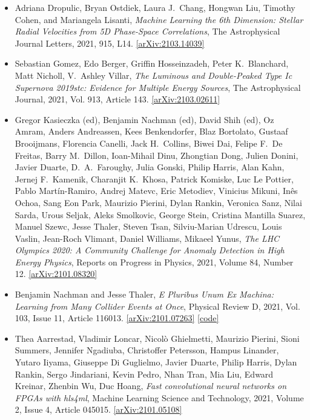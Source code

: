 \begin{itemize}
\item Adriana Dropulic, Bryan Ostdiek, Laura J.\  Chang, Hongwan Liu, Timothy Cohen, and Mariangela Lisanti, \textit{Machine Learning the 6th Dimension: Stellar Radial Velocities from 5D Phase-Space Correlations}, The Astrophysical Journal Letters, 2021, 915, L14. \href{https://arxiv.org/abs/2103.14039}{[arXiv:2103.14039]} 
\item Sebastian Gomez, Edo Berger, Griffin Hosseinzadeh, Peter K.\  Blanchard, Matt Nicholl, V.\  Ashley Villar, \textit{The Luminous and Double-Peaked Type Ic Supernova 2019stc: Evidence for Multiple Energy Sources}, The Astrophysical Journal, 2021, Vol. 913, Article 143. \href{https://arxiv.org/abs/2103.02611}{[arXiv:2103.02611]} 
\item Gregor Kasieczka (ed), Benjamin Nachman (ed), David Shih (ed), Oz Amram, Anders Andreassen, Kees Benkendorfer, Blaz Bortolato, Gustaaf Brooijmans, Florencia Canelli, Jack H.\  Collins, Biwei Dai, Felipe F.\  De Freitas, Barry M.\  Dillon, Ioan-Mihail Dinu, Zhongtian Dong, Julien Donini, Javier Duarte, D.\  A.\  Faroughy, Julia Gonski, Philip Harris, Alan Kahn, Jernej F.\  Kamenik, Charanjit K.\  Khosa, Patrick Komiske, Luc Le Pottier, Pablo Martín-Ramiro, Andrej Matevc, Eric Metodiev, Vinicius Mikuni, Inês Ochoa, Sang Eon Park, Maurizio Pierini, Dylan Rankin, Veronica Sanz, Nilai Sarda, Urous Seljak, Aleks Smolkovic, George Stein, Cristina Mantilla Suarez, Manuel Szewc, Jesse Thaler, Steven Tsan, Silviu-Marian Udrescu, Louis Vaslin, Jean-Roch Vlimant, Daniel Williams, Mikaeel Yunus, \textit{The LHC Olympics 2020: A Community Challenge for Anomaly Detection in High Energy Physics}, Reports on Progress in Physics, 2021, Volume 84, Number 12. \href{https://arxiv.org/abs/2101.08320}{[arXiv:2101.08320]} 
\item Benjamin Nachman and Jesse Thaler, \textit{E Pluribus Unum Ex Machina: Learning from Many Collider Events at Once}, Physical Review D, 2021, Vol. 103, Issue 11, Article 116013. \href{https://arxiv.org/abs/2101.07263}{[arXiv:2101.07263]}  \href{https://github.com/bnachman/EnsembleLearning}{[code]} 
\item Thea Aarrestad, Vladimir Loncar, Nicolò Ghielmetti, Maurizio Pierini, Sioni Summers, Jennifer Ngadiuba, Christoffer Petersson, Hampus Linander, Yutaro Iiyama, Giuseppe Di Guglielmo, Javier Duarte, Philip Harris, Dylan Rankin, Sergo Jindariani, Kevin Pedro, Nhan Tran, Mia Liu, Edward Kreinar, Zhenbin Wu, Duc Hoang, \textit{Fast convolutional neural networks on FPGAs with hls4ml}, Machine Learning Science and Technology, 2021, Volume 2, Issue 4, Article 045015. \href{https://arxiv.org/abs/2101.05108}{[arXiv:2101.05108]} 

\end{itemize}
